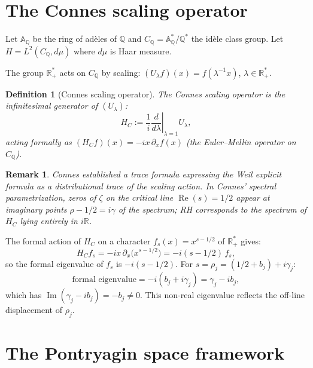 \documentclass[11pt]{amsart}
\newtheorem{definition}[theorem]{Definition}
\newtheorem{remark}[theorem]{Remark}
\renewcommand{\Re}{\operatorname{Re}}
\renewcommand{\Im}{\operatorname{Im}}
\newcommand{\AQ}{\mathbb{A}_{\mathbb{Q}}}
\newcommand{\CQ}{C_{\mathbb{Q}}}
\begin{document}
\section{The Connes scaling operator}
\label{sec:connes}

Let $\AQ$ be the ring of ad\`eles of $\mathbb{Q}$ and $\CQ = \AQ^*/\mathbb{Q}^*$ the
id\`ele class group.  Let $H = L^2(\CQ, d\mu)$ where $d\mu$ is Haar measure.

The group $\mathbb{R}^*_+$ acts on $\CQ$ by scaling:
$(U_\lambda f)(x) = f(\lambda^{-1}x)$, $\lambda \in \mathbb{R}^*_+$.

\begin{definition}[Connes scaling operator]\label{def:hc}
The \emph{Connes scaling operator} is the infinitesimal generator of $(U_\lambda)$:
\[
  H_C := \frac{1}{i}\left.\frac{d}{d\lambda}\right|_{\lambda=1} U_\lambda,
\]
acting formally as $(H_C f)(x) = -ix\,\partial_x f(x)$ (the Euler--Mellin operator
on $\CQ$).
\end{definition}

\begin{remark}\label{rem:connes-spectrum}
Connes \cite{Connes99} established a trace formula expressing the Weil explicit formula
as a distributional trace of the scaling action.  In Connes' spectral parametrization,
zeros of $\zeta$ on the critical line $\Re(s)=1/2$ appear at imaginary points
$\rho - 1/2 = i\gamma$ of the spectrum; RH corresponds to the spectrum of $H_C$ lying
entirely in $i\mathbb{R}$.
\end{remark}

The formal action of $H_C$ on a character $f_s(x) = x^{s-1/2}$ of $\mathbb{R}^*_+$ gives:
\[
  H_C f_s = -ix\,\partial_x\bigl(x^{s-1/2}\bigr) = -i(s-1/2)\,f_s,
\]
so the formal eigenvalue of $f_s$ is $-i(s-1/2)$.  For $s = \rho_j = (1/2+b_j)+i\gamma_j$:
\[
  \text{formal eigenvalue} = -i(b_j+i\gamma_j) = \gamma_j - ib_j,
\]
which has $\Im(\gamma_j - ib_j) = -b_j \ne 0$.  This non-real eigenvalue reflects the
off-line displacement of $\rho_j$.

\section{The Pontryagin space framework}
\label{sec:pontryagin}
\end{document}
